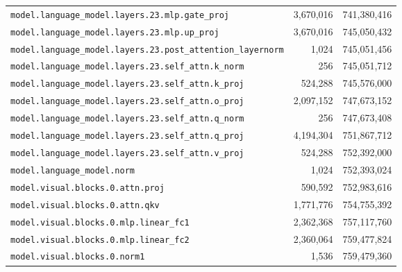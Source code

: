 \documentclass[10pt,a4paper]{article}
\theoremstyle{definition}
\begin{document}
\begin{appendices}
\begin{longtable}{p{9.5cm}rr}
\texttt{model.\allowbreak{}language\_model.\allowbreak{}layers.\allowbreak{}23.\allowbreak{}mlp.\allowbreak{}gate\_proj} & 3,670,016 & 741,380,416 \\
\texttt{model.\allowbreak{}language\_model.\allowbreak{}layers.\allowbreak{}23.\allowbreak{}mlp.\allowbreak{}up\_proj} & 3,670,016 & 745,050,432 \\
\texttt{model.\allowbreak{}language\_model.\allowbreak{}layers.\allowbreak{}23.\allowbreak{}post\_attention\_layernorm} & 1,024 & 745,051,456 \\
\texttt{model.\allowbreak{}language\_model.\allowbreak{}layers.\allowbreak{}23.\allowbreak{}self\_attn.\allowbreak{}k\_norm} & 256 & 745,051,712 \\
\texttt{model.\allowbreak{}language\_model.\allowbreak{}layers.\allowbreak{}23.\allowbreak{}self\_attn.\allowbreak{}k\_proj} & 524,288 & 745,576,000 \\
\texttt{model.\allowbreak{}language\_model.\allowbreak{}layers.\allowbreak{}23.\allowbreak{}self\_attn.\allowbreak{}o\_proj} & 2,097,152 & 747,673,152 \\
\texttt{model.\allowbreak{}language\_model.\allowbreak{}layers.\allowbreak{}23.\allowbreak{}self\_attn.\allowbreak{}q\_norm} & 256 & 747,673,408 \\
\texttt{model.\allowbreak{}language\_model.\allowbreak{}layers.\allowbreak{}23.\allowbreak{}self\_attn.\allowbreak{}q\_proj} & 4,194,304 & 751,867,712 \\
\texttt{model.\allowbreak{}language\_model.\allowbreak{}layers.\allowbreak{}23.\allowbreak{}self\_attn.\allowbreak{}v\_proj} & 524,288 & 752,392,000 \\
\texttt{model.\allowbreak{}language\_model.\allowbreak{}norm} & 1,024 & 752,393,024 \\
\texttt{model.\allowbreak{}visual.\allowbreak{}blocks.\allowbreak{}0.\allowbreak{}attn.\allowbreak{}proj} & 590,592 & 752,983,616 \\
\texttt{model.\allowbreak{}visual.\allowbreak{}blocks.\allowbreak{}0.\allowbreak{}attn.\allowbreak{}qkv} & 1,771,776 & 754,755,392 \\
\texttt{model.\allowbreak{}visual.\allowbreak{}blocks.\allowbreak{}0.\allowbreak{}mlp.\allowbreak{}linear\_fc1} & 2,362,368 & 757,117,760 \\
\texttt{model.\allowbreak{}visual.\allowbreak{}blocks.\allowbreak{}0.\allowbreak{}mlp.\allowbreak{}linear\_fc2} & 2,360,064 & 759,477,824 \\
\texttt{model.\allowbreak{}visual.\allowbreak{}blocks.\allowbreak{}0.\allowbreak{}norm1} & 1,536 & 759,479,360 \\

\end{longtable}
\end{appendices}
\end{document}
